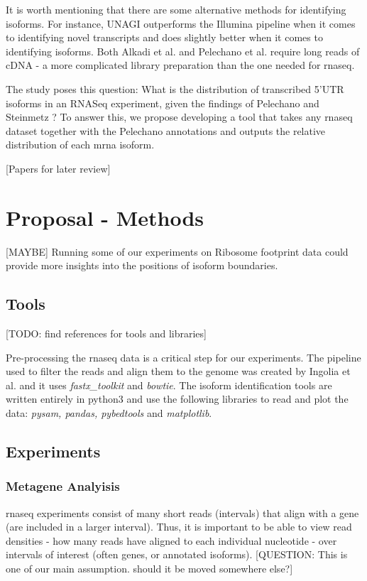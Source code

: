 \documentclass[12pt]{article}
\begin{document}
It is worth mentioning that there are some alternative methods for identifying isoforms. For instance, UNAGI\cite{Alkadi2020} outperforms the Illumina pipeline when it comes to identifying novel transcripts and does slightly better when it comes to identifying isoforms. Both Alkadi et al. \cite{Alkadi2020} and Pelechano et al. \cite{Pelechano2013} require long reads of cDNA - a more complicated library preparation than the one needed for \acrshort{rnaseq}.

The study poses this question: What is the distribution of transcribed 5’UTR isoforms in an RNASeq experiment, given the findings of Pelechano and Steinmetz \cite{Pelechano2013}? To answer this, we propose developing a tool that takes any \acrshort{rnaseq} dataset together with the Pelechano annotations and outputs the relative distribution of each \acrshort{mrna} isoform. 

{\tiny [Papers for later review]} \cite{Kim2009} \cite{Lee2002} \cite{ReixachsSol2020} \cite{Thorrez2008} 

\section{Proposal - Methods}\label{methods}


{\tiny[MAYBE]}
Running some of our experiments on Ribosome footprint data could provide more insights into the positions of isoform boundaries.

\subsection{Tools}\label{tools}
{\tiny[TODO: find references for tools and libraries]}

Pre-processing the \acrshort{rnaseq} data is a critical step for our experiments. The pipeline used to filter the reads and align them to the genome was created by Ingolia et al. \cite{Ingolia2012} and it uses \textit{fastx\_toolkit} and \textit{bowtie}. The isoform identification tools are written entirely in python3 and use the following libraries to read and plot the data: \textit{pysam, pandas, pybedtools} and \textit{matplotlib}. 

\subsection{Experiments}\label{experiments}
\subsubsection{Metagene Analyisis}\label{metagene}
\acrshort{rnaseq} experiments consist of many short reads (intervals) that align with a gene (are included in a larger interval). Thus, it is important to be able to view read densities - how many reads have aligned to each individual nucleotide - over intervals of interest (often genes, or annotated isoforms). {\tiny [QUESTION: This is one of our main assumption. should it be moved somewhere else?]} 
\end{document}
